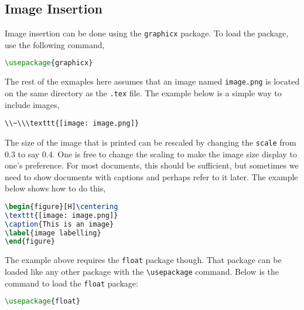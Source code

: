 \documentclass[a4paper, 12pt]{report}
\begin{document}
\begin{center}
\subsection{Image Insertion}
\begin{comment}
\end{comment}
Image insertion can be done using the \texttt{graphicx} package. To load the package, use the following command,
\begin{lstlisting}[language=tex]
\usepackage{graphicx}
\end{lstlisting}
The rest of the exmaples here assumes that an image named \texttt{image.png} is located on the same directory as the \texttt{.tex} file. The example below is a simple way to include images,
\begin{lstlisting}
\\~\\\texttt{[image: image.png]}
\end{lstlisting}
The size of the image that is printed can be rescaled by changing the \texttt{scale} from $0.3$ to say $0.4$. One is free to change the scaling to make the image size display to one's preference. For most documents, this should be sufficient, but sometimes we need to show documents with captions and perhaps refer to it later. The example below shows how to do this,
\begin{lstlisting}[language=tex]
\begin{figure}[H]\centering
\texttt{[image: image.png]}
\caption{This is an image}
\label{image labelling}
\end{figure}
\end{lstlisting}
The example above requires the \texttt{float} package though. That package can be loaded like any other package with the \texttt{\textbackslash usepackage} command. Below is the command to load the \texttt{float} package:
\begin{lstlisting}[language=tex]
\usepackage{float}
\end{lstlisting}


\end{center}
\end{document}
